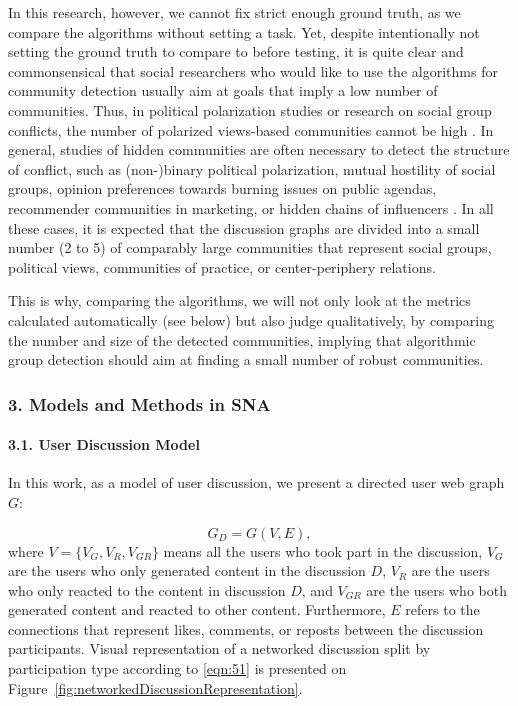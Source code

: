 In this research, however, we cannot fix strict enough ground truth, as we compare the algorithms without setting a task. Yet, despite intentionally not setting the ground truth to compare to before testing, it is quite clear and commonsensical that social researchers who would like to use the algorithms for community detection usually aim at goals that imply a low number of communities. Thus, in political polarization studies or research on social group conflicts, the number of polarized views-based communities cannot be high \cite{BodrunovaBlekanovSmoliarova}. In general, studies of hidden communities are often necessary to detect the structure of conflict, such as (non-)binary political polarization, mutual hostility of social groups, opinion preferences towards burning issues on public agendas, recommender communities in marketing, or hidden chains of influencers \cite{BodrunovaBlekanovMaksimov}. In all these cases, it is expected that the discussion graphs are divided into a small number (2 to 5) of comparably large communities that represent social groups, political views, communities of practice, or center-periphery relations.

This is why, comparing the algorithms, we will not only look at the metrics calculated automatically (see below) but also judge qualitatively, by comparing the number and size of the detected communities, implying that algorithmic group detection should aim at finding a small number of robust communities.

\subsubsection{3. Models and Methods in SNA}

\paragraph{3.1. User Discussion Model} In this work, as a model of user discussion, we present a directed user web graph \(G\):

\begin{equation}
	\label{eqn:51}
	G_D = G(V,E),
\end{equation} where \(V = \{V_G,V_R, V_{GR}\}\) means all the users who took part in the discussion, \(V_G\) are the users who only generated content in the discussion \(D\), \(V_R\) are the users who only reacted to the content in discussion \(D\), and \(V_{GR}\) are the users who both generated content and reacted to other content. Furthermore, \(E\) refers to the connections that represent likes, comments, or reposts between the discussion participants. Visual representation of a networked discussion split by participation type according to \cref{eqn:51} is presented on Figure~\cref{fig:networkedDiscussionRepresentation}.

